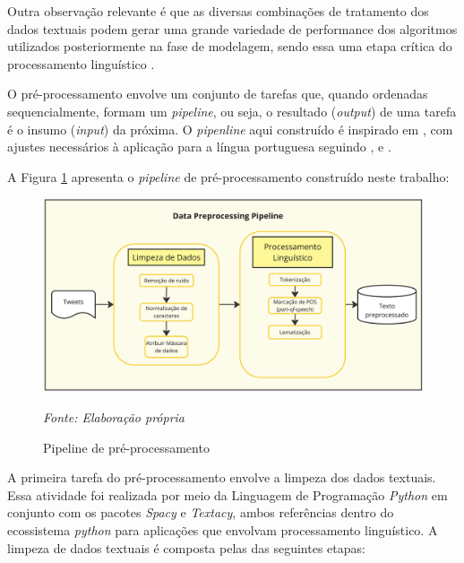 Outra observação relevante é que as diversas combinações de tratamento dos dados textuais podem gerar uma grande variedade de performance dos algoritmos utilizados posteriormente na fase de modelagem, sendo essa uma etapa crítica do processamento linguístico \parencite{de_oliveira_joint_2021}.

O pré-processamento envolve um conjunto de tarefas que, quando ordenadas sequencialmente, formam um \textit{pipeline}, ou seja, o resultado (\textit{output}) de uma tarefa é o insumo (\textit{input}) da próxima. O \textit{pipenline} aqui construído é inspirado em \textcite{albrecht_blueprints_2020}, com ajustes necessários à aplicação para a língua portuguesa seguindo \textcite{cirqueira_literature_2018}, \textcite{de_oliveira_joint_2021} e \textcite{souza_sentiment_2021}.

A Figura \ref{fig:pipeline_preprocessamento} apresenta o \textit{pipeline} de pré-processamento construído neste trabalho:

\begin{figure}[H]
    \captionsetup{position=above} %
    \caption{Pipeline de pré-processamento}
    \centering
    \includegraphics[scale=0.050]{imagens/figura_pipeline_preprocessamento_pt.jpg}
    \label{fig:pipeline_preprocessamento}
    \par\noindent
    \begin{minipage}{\textwidth}
        \centering
        \footnotesize %
        \textit{Fonte: Elaboração própria}
    \end{minipage}
\end{figure}

A primeira tarefa do pré-processamento envolve a limpeza dos dados textuais. Essa atividade foi realizada por meio da Linguagem de Programação \textit{Python} em conjunto com os pacotes \textit{Spacy} e \textit{Textacy}, ambos referências dentro do ecossistema \textit{python} para aplicações que envolvam processamento linguístico. A limpeza de dados textuais é composta pelas das seguintes etapas:

